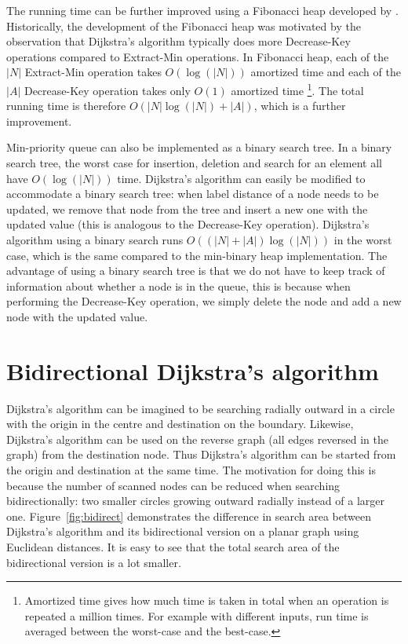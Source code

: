 The running time can be further improved using a Fibonacci heap developed by \citet{Fredman}.
Historically, the development of the Fibonacci heap was motivated by the observation that Dijkstra's algorithm typically does more Decrease-Key operations compared to Extract-Min operations.
In Fibonacci heap, each of the $|N|$ Extract-Min operation takes $O(\log(|N|))$ amortized time
and each of the $|A|$ Decrease-Key operation takes only $O(1)$ amortized time
\footnote{Amortized time gives how much time is taken in total when an operation is repeated a million times. For example with different inputs, run time is averaged between the worst-case and the best-case.}.
The total running time is therefore $O(|N| \log(|N|)+|A|)$,
which is a further improvement.

Min-priority queue can also be implemented as a binary search tree.
In a binary search tree, the worst case for insertion, deletion and search for an element all have $O(\log(|N|))$ time.
Dijkstra's algorithm can easily be modified to accommodate a binary search tree:
when label distance of a node needs to be updated,
we remove that node from the tree and insert a new one with the updated value (this is analogous to the Decrease-Key operation).
Dijkstra's algorithm using a binary search runs $O((|N|+|A|)\log(|N|))$ in the worst case, which is the same compared to the min-binary heap implementation.
The advantage of using a binary search tree is that we do not have to keep track of information about whether a node is in the queue,
this is because when performing the Decrease-Key operation,
we simply delete the node and add a new node with the updated value.


\section{Bidirectional Dijkstra's algorithm} \label{section:bidirectional}
Dijkstra's algorithm can be imagined to be searching radially outward in a circle with the origin in the centre and destination on the boundary.
Likewise, Dijkstra's algorithm can be used on the reverse graph (all edges reversed in the graph) from the destination node.
Thus Dijkstra's algorithm can be started from the origin and destination at the same time.
The motivation for doing this is because the number of scanned nodes can be reduced when searching bidirectionally:
two smaller circles growing outward radially instead of a larger one.
Figure~\ref{fig:bidirect} demonstrates the difference in search area between Dijkstra's algorithm and its bidirectional version on a planar graph using Euclidean distances.
It is easy to see that the total search area of the bidirectional version is a lot smaller.

